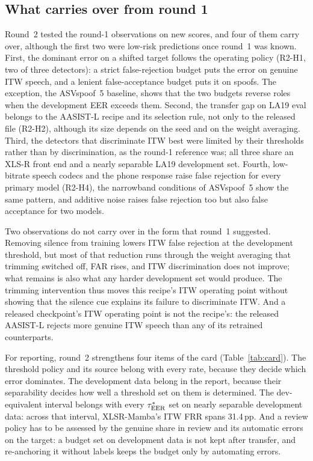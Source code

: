 \subsection{What carries over from round 1}
Round~2 tested the round-1 observations on new scores, and four of them carry over, although the first two were
low-risk predictions once round~1 was known. First, the dominant error on a shifted target follows the operating policy
(R2-H1, two of three detectors): a strict false-rejection budget puts the error on genuine ITW speech, and a lenient
false-acceptance budget puts it on spoofs. The exception, the ASVspoof~5 baseline, shows that the two budgets reverse
roles when the development EER exceeds them. Second, the transfer gap on LA19 eval belongs to the AASIST-L recipe and
its selection rule, not only to the released file (R2-H2), although its size depends on the seed and on the weight
averaging. Third, the detectors that discriminate ITW best were limited by their thresholds rather than by
discrimination, as the round-1 reference was; all three share an XLS-R front end and a nearly separable LA19
development set. Fourth, low-bitrate speech codecs and the phone response raise false rejection for every primary model
(R2-H4), the narrowband conditions of ASVspoof~5 show the same pattern, and additive noise raises false rejection too but
also false acceptance for two models.

Two observations do not carry over in the form that round~1 suggested. Removing silence from training lowers ITW false
rejection at the development threshold, but most of that reduction runs through the weight averaging that trimming
switched off, FAR rises, and ITW discrimination does not improve; what remains is also what any harder development set
would produce. The trimming intervention thus moves this recipe's ITW operating point without showing that the silence
cue explains its failure to discriminate ITW. And a released checkpoint's ITW operating point is not the recipe's: the
released AASIST-L rejects more genuine ITW speech than any of its retrained counterparts.

For reporting, round~2 strengthens four items of the card (Table~\ref{tab:card}). The threshold policy and its source
belong with every rate, because they decide which error dominates. The development data belong in the report, because
their separability decides how well a threshold set on them is determined. The dev-equivalent interval belongs with
every \(\tau^{*}_{\mathrm{EER}}\) set on nearly separable development data: across that interval, XLSR-Mamba's ITW FRR spans 31.4\,pp.
And a review policy has to be assessed by the genuine share in review and its automatic errors on the target: a budget
set on development data is not kept after transfer, and re-anchoring it without labels keeps the budget only by
automating errors.

